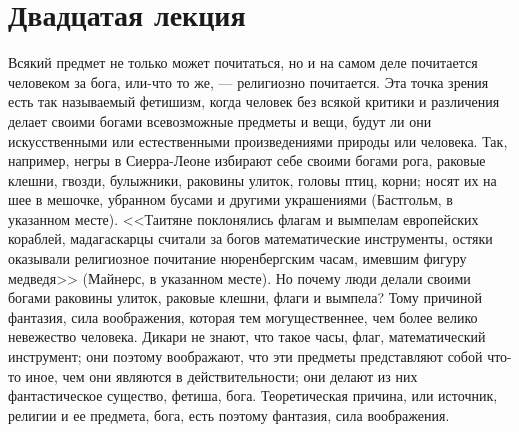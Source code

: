 \documentclass[12pt]{article}
\begin{document}
\section*{Двадцатая лекция}

Всякий предмет не только может почитаться, но и на самом деле почитается человеком за бога, или-что то же, --- религиозно почитается. Эта точка зрения есть так называемый фетишизм, когда человек без всякой критики и различения делает своими богами всевозможные предметы и вещи, будут ли они искусственными или естественными произведениями природы или человека. Так, например, негры в Сиерра-Леоне избирают себе своими богами рога, раковые клешни, гвозди, булыжники, раковины улиток, головы птиц, корни; носят их на шее в мешочке, убранном бусами и другими украшениями (Бастгольм, в указанном месте). <<Таитяне поклонялись флагам и вымпелам европейских кораблей, мадагаскарцы считали за богов математические инструменты, остяки оказывали религиозное почитание нюренбергским часам, имевшим фигуру медведя>> (Майнерс, в указанном месте). Но почему люди делали своими богами раковины улиток, раковые клешни, флаги и вымпела? Тому причиной фантазия, сила воображения, которая тем могущественнее, чем более велико невежество человека. Дикари не знают, что такое часы, флаг, математический инструмент; они поэтому воображают, что эти предметы представляют собой что-то иное, чем они являются в действительности; они делают из них фантастическое существо, фетиша, бога. Теоретическая причина, или источник, религии и ее предмета, бога, есть поэтому фантазия, сила воображения. 
\end{document}

